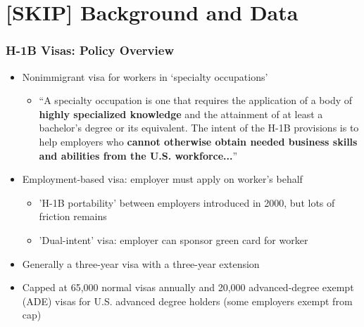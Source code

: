 \documentclass[xcolor=dvipsnames, compress, 12pt, aspectratio=169, handout]{beamer}
\begin{document}
\section{[SKIP] Background and Data}

\begin{frame}
    \frametitle{H-1B Visas: Policy Overview}
    \begin{itemize}
        \item Nonimmigrant visa for workers in `specialty occupations' 
        \begin{itemize}
            \item ``A specialty occupation is one that requires the application of a body of \textbf{highly specialized knowledge} and the attainment of at least a bachelor’s degree or its equivalent. The intent of the H-1B provisions is to help employers who \textbf{cannot otherwise obtain needed business skills and abilities from the U.S. workforce...}''
        \end{itemize}
        \item Employment-based visa: employer must apply on worker's behalf
        \begin{itemize}
            \item 'H-1B portability' between employers introduced in 2000, but lots of friction remains
            \item 'Dual-intent' visa: employer can sponsor green card for worker 
        \end{itemize}
        \item Generally a three-year visa with a three-year extension
        \item Capped at 65,000 normal visas annually and 20,000 advanced-degree exempt (ADE) visas for U.S. advanced degree holders (some employers exempt from cap)
    \end{itemize}
\end{frame}%
\end{document}
